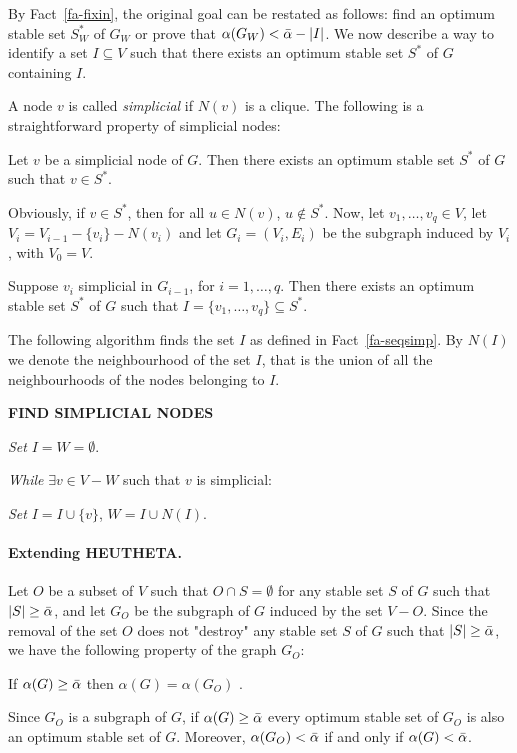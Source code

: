 By Fact~\ref{fa-fixin}, the original goal can be restated as
follows: find an optimum stable set $S^*_W$ of $G_W$ or prove that
$\alpha(G_W)<{\bar \alpha}-|I|$. 
We now describe a way to identify a set $I \subseteq V$ such that
there exists an optimum stable set $S^*$ of $G$ containing $I$. 

A node $v$ is called {\it simplicial} if $N(v)$ is a clique. The
following is a straightforward property of simplicial nodes:
\begin{fact}
   Let $v$ be a simplicial node of $G$.
   Then  there exists an optimum stable set $S^*$ of $G$ such that
   $v \in S^*$.  
\end{fact}
Obviously, if $v \in S^*$, then for all $u \in N(v)$, $u \notin
S^*$. Now, let
$v_1,\dots,v_q \in V$, let $V_i=V_{i-1}-\{v_i\}-N(v_i)$ and let
$G_i=(V_i,E_i)$ be the subgraph induced by $V_i$, with $V_0=V$.  
\begin{fact}
\label{fa-seqsimp}
Suppose $v_i$ simplicial in
$G_{i-1}$, for $i=1,\dots,q$. Then there exists an optimum stable
set $S^*$ of $G$ such that $I=\{v_1,\dots,v_q\}\subseteq S^*$.
\end{fact}
The following algorithm finds the set $I$ as defined in
Fact~\ref{fa-seqsimp}. By $N(I)$ we denote the neighbourhood of the
set $I$, that is the union of all the neighbourhoods of the nodes
belonging to $I$.
 \begin{description}
   \item{\bf FIND SIMPLICIAL NODES}    
   \begin{description}
       \item {\it Set} $I = W = \emptyset$. 
       \item {\it While} $\exists v \in V-W$ such that $v$ is
             simplicial: 
       \begin{description}  
          \item {\it Set} $I=I\cup\{v\}$,  $W=I\cup N(I)$.
       \end{description}
     \end{description}
 \end{description}

\paragraph {Extending HEUTHETA.} Let $O$ be a subset
of $V$ such that $O\cap S=\emptyset$ for any stable set $S$ of $G$
such that $|S|\geq{\bar \alpha}$, and let $G_O$ be the subgraph of $G$
induced by the set $V-O$. Since the removal of the set $O$ does not
"destroy" any stable set $S$ of $G$ such that $|S|\geq{\bar \alpha}$, we have
the following property of the graph $G_O$:
\begin{fact}
\label{fa-fixout}
If $\alpha(G)\geq{\bar \alpha}$ then $\alpha(G)=\alpha(G_O)$ . 
\end{fact}
Since $G_O$ is a subgraph of $G$, if $\alpha(G)\geq{\bar \alpha}$
every optimum stable set of $G_O$ is also an optimum stable set of
$G$. Moreover, $\alpha(G_O)<{\bar \alpha}$ if and only if
$\alpha(G)<{\bar \alpha}$. 

